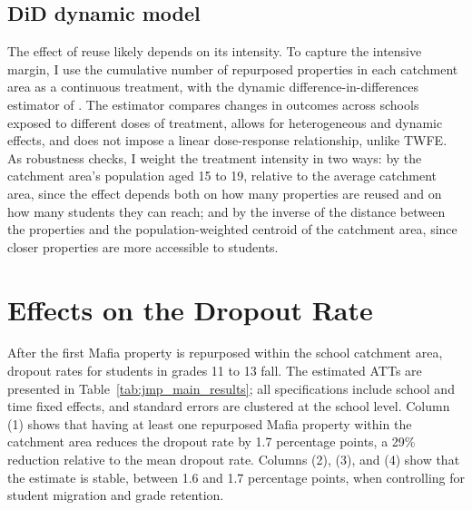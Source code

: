 \documentclass[12pt]{article}
\theoremstyle{plain}
\theoremstyle{plain}
\theoremstyle{plain}
\theoremstyle{definition}
\theoremstyle{plain}
\theoremstyle{definition}
\theoremstyle{plain}
\theoremstyle{remark}
\theoremstyle{definition}
\theoremstyle{definition}
\theoremstyle{plain}
\begin{document}
\subsection{DiD dynamic model}
\label{sec:jmp_did_dynamic}
The effect of reuse likely depends on its intensity. To capture the intensive margin, I use the cumulative number of repurposed properties in each catchment area as a continuous treatment, with the dynamic difference-in-differences estimator of \citet{de_chaisemartin_two-way_2020}. The estimator compares changes in outcomes across schools exposed to different doses of treatment, allows for heterogeneous and dynamic effects, and does not impose a linear dose-response relationship, unlike TWFE. As robustness checks, I weight the treatment intensity in two ways: by the catchment area's population aged 15 to 19, relative to the average catchment area, since the effect depends both on how many properties are reused and on how many students they can reach; and by the inverse of the distance between the properties and the population-weighted centroid of the catchment area, since closer properties are more accessible to students. \par




\section{Effects on the Dropout Rate}
\label{sec:jmp_results}

After the first Mafia property is repurposed within the school catchment area, dropout rates for students in grades 11 to 13 fall. The estimated ATTs are presented in Table~\ref{tab:jmp_main_results}; all specifications include school and time fixed effects, and standard errors are clustered at the school level. Column (1) shows that having at least one repurposed Mafia property within the catchment area reduces the dropout rate by 1.7 percentage points, a 29\% reduction relative to the mean dropout rate. Columns (2), (3), and (4) show that the estimate is stable, between 1.6 and 1.7 percentage points, when controlling for student migration and grade retention. \par
\end{document}
